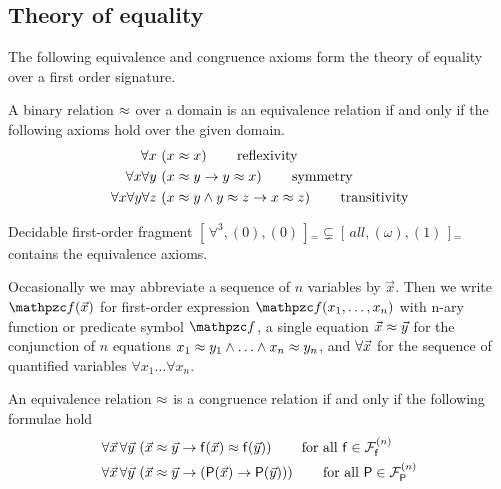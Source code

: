 \subsection{Theory of equality}

The following equivalence and congruence axioms form the theory of equality over a first order signature.

\begin{definition}
	[Equivalence] A binary relation \( \approx \) over a domain
	is an equivalence relation if and only if the following axioms hold over the given domain.\label{def:equivalence:axioms}
\begin{align*}
\forall x\,
&\left(x \approx x\right)
\tag*{reflexivity}
\\
\forall x \forall y\,
&\left(x \approx y \rightarrow y \approx x \right)
\tag*{symmetry}
\\
\forall x \forall y \forall z\,
&\left(x \approx y \land y\approx z \rightarrow x\approx z\right)
\tag*{transitivity}
\end{align*}
\end{definition}

\begin{remark}
	Decidable first-order fragment
	\(
		[ \, \forall^3, (0), (0) \, ]{}_{=}
		\subsetneq
		[ \, all, (\omega), (1) \, ]{}_{=}
	\)
	contains the equivalence axioms.
\end{remark}


\begin{definition}
	Occasionally we may abbreviate a sequence of \( n \) variables by \( \vec{x} \).
	Then we write \( \mcf(\vecn{x}) \)
	for first-order expression \( \mcf(x_1,\ldots,x_n) \)
	with n-ary function or predicate symbol \( \mcf \),
	a single equation \( \vec{x}\approx\vec{y} \) for
	the conjunction of \( n \) equations
	\( x_1\approx y_1\land\ldots\land x_n\approx y_n \),
	and \( \forall\vec{x} \) for
	the sequence of quantified variables \( \forall x_1\ldots\forall x_n \).
\end{definition}

\begin{definition}
	 An equivalence relation \( \approx \) is a congruence relation if and only if
	the following formulae hold\label{def:congruence:schemata}
	\begin{align*}
	\forall\vecn{x}\,\forall\vecn{y}\,
	&\left(\vecn{x}\mEQ\vecn{y} \limp \mf(\vecn{x}) \mEQ \mf(\vecn{y}) \right)
	\tag*{for all \( \mf\in\mcFfn \)}
	\\
	\forall\vecn{x}\,\forall\vecn{y}\,
	&\left(\vecn{x}\mEQ\vecn{y} \limp (\mP(\vecn{x}) \limp \mP(\vecn{y}))\right)
	\tag*{for all \( \mP\in\mcFPn \)}
	\end{align*}
\end{definition}

